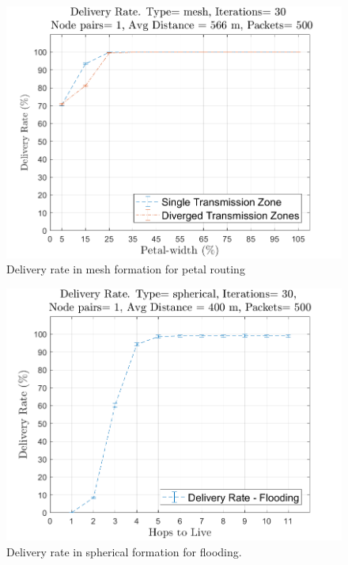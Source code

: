 \begin{figure}[hbtp]
\centering
\includegraphics[width=\simResultFigSize \textwidth]{ncsuthesis-0.6/Chapter-5/figs/pe_DR_mesh.png}
\caption{Delivery rate in mesh formation for petal routing}
\label{fig:pe_DR_mesh}
\end{figure}

\begin{figure}[hbtp]
\centering
\includegraphics[width=\simResultFigSize \textwidth]{ncsuthesis-0.6/Chapter-5/figs/fl_DR_spherical.png}
\caption{Delivery rate in spherical formation for flooding.}
\label{fig:fl_DR_spherical}
\end{figure}

